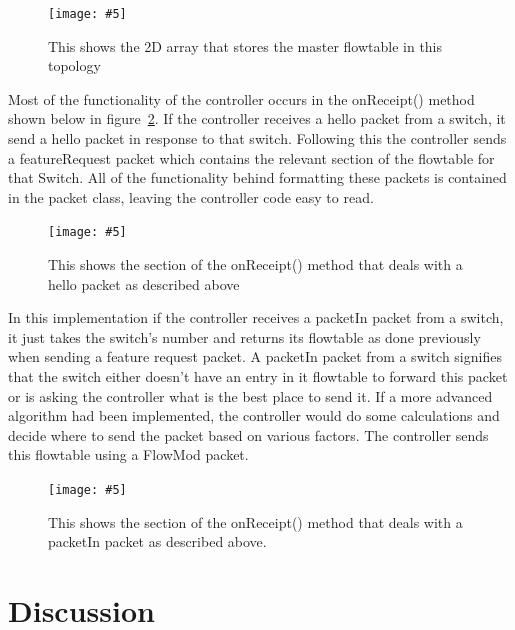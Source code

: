\documentclass{article}
\newcommand{\includescalefigure}[5]{
\begin{figure}[htb]
\centering
\texttt{[image: \#5]}
\captionsetup{width=.8\linewidth} 
\caption[#2]{#3}
\label{#1}
\end{figure}
}
\begin{document}
\includescalefigure{MasterFlowTable}{MasterFlowTable}{This shows the 2D array that stores the master flowtable in this topology}{1}{Master-Flowtable.PNG}

Most of the functionality of the controller occurs in the onReceipt() method shown below in figure~\ref{onReceiptHelloController}. If the controller receives a hello packet from a switch, it send a hello packet in response to that switch. Following this the controller sends a featureRequest packet which contains the relevant section of the flowtable for that Switch. All of the functionality behind formatting these packets is contained in the packet class, leaving the controller code easy to read.
\pagebreak
\includescalefigure{onReceiptHelloController}{onReceiptHelloController}{This shows the section of the onReceipt() method that deals with a hello packet as described above}{1}{onReceipt-Controller-Hello.PNG}

In this implementation if the controller receives a packetIn packet from a switch, it just takes the switch's number and returns its flowtable as done previously when sending a feature request packet. A packetIn packet from a switch signifies that the switch either doesn't have an entry in it flowtable to forward this packet or is asking the controller what is the best place to send it. If a more advanced algorithm had been implemented, the controller would do some calculations and decide where to send the packet based on various factors. The controller sends this flowtable using a FlowMod packet.

\includescalefigure{onReceiptPacketInController}{onReceiptPacketInController}{This shows the section of the onReceipt() method that deals with a packetIn packet as described above.}{1}{onReceipt-Controller-PacketIn.PNG}

\section{Discussion}
\end{document}
